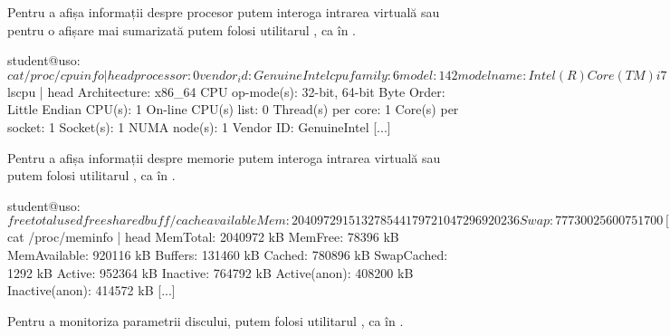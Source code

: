 Pentru a afișa informații despre procesor putem interoga intrarea virtuală  sau pentru o afișare mai sumarizată putem folosi utilitarul , ca în .

\begin{screen}[caption={Informații despre procesor},label={lst:hw:cpu}]
student@uso:~$ cat /proc/cpuinfo | head
processor	: 0
vendor_id	: GenuineIntel
cpu family	: 6
model		: 142
model name	: Intel(R) Core(TM) i7-8565U CPU @ 1.80GHz
stepping	: 12
cpu MHz		: 1992.017
cache size	: 8192 KB
physical id	: 0
siblings	: 1
[...]

student@uso:~$ lscpu | head
Architecture:        x86_64
CPU op-mode(s):      32-bit, 64-bit
Byte Order:          Little Endian
CPU(s):              1
On-line CPU(s) list: 0
Thread(s) per core:  1
Core(s) per socket:  1
Socket(s):           1
NUMA node(s):        1
Vendor ID:           GenuineIntel
[...]
\end{screen}


Pentru a afișa informații despre memorie putem interoga intrarea virtuală  sau putem folosi utilitarul , ca în .

\begin{screen}[caption={Informații despre memorie},label={lst:hw:memory}]
student@uso:~$ free
              total        used        free      shared  buff/cache   available
Mem:        2040972      915132       78544       17972     1047296      920236
Swap:        777300       25600      751700
[...]

student@uso:~$ cat /proc/meminfo | head
MemTotal:        2040972 kB
MemFree:           78396 kB
MemAvailable:     920116 kB
Buffers:          131460 kB
Cached:           780896 kB
SwapCached:         1292 kB
Active:           952364 kB
Inactive:         764792 kB
Active(anon):     408200 kB
Inactive(anon):   414572 kB
[...]
\end{screen}

Pentru a monitoriza parametrii discului, putem folosi utilitarul , ca în .


